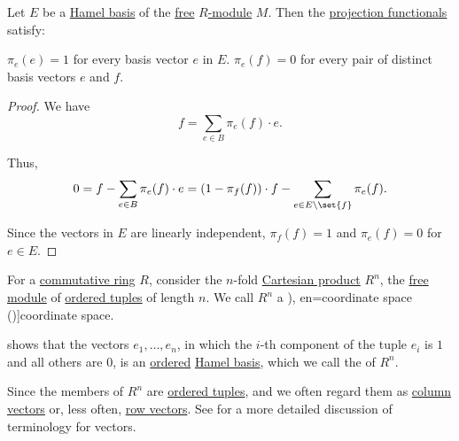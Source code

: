 \begin{proposition}\label{thm:basis_projection_orthonormal}
  Let \( E \) be a \hyperref[def:hamel_basis]{Hamel basis} of the \hyperref[rem:free_module]{free} \hyperref[def:module]{\( R \)-module} \( M \). Then the \hyperref[def:basis_decomposition]{projection functionals} satisfy:
  \begin{thmenum}
     \( \pi_e(e) = 1 \) for every basis vector \( e \) in \( E \).
     \( \pi_e(f) = 0 \) for every pair of distinct basis vectors \( e \) and \( f \).
  \end{thmenum}
\end{proposition}
\begin{proof}
  We have
  \begin{equation*}
    f = \sum_{e \in B} \pi_e(f) \cdot e.
  \end{equation*}

  Thus,
  \begin{equation*}
    0 = f - \sum_{e \in B} \pi_e(f) \cdot e = (1 - \pi_f(f)) \cdot f - \sum_{e \in E \setminus \set{ f }} \pi_e(f).
  \end{equation*}

  Since the vectors in \( E \) are linearly independent, \( \pi_f(f) = 1 \) and \( \pi_e(f) = 0 \) for \( e \in E \).
\end{proof}

\begin{definition}\label{def:coordinate_space}\mimprovised
  For a \hyperref[def:ring/commutative]{commutative ring} \( R \), consider the \( n \)-fold \hyperref[def:cartesian_product]{Cartesian product} \( R^n \), the \hyperref[def:free_semimodule]{free module} of \hyperref[def:ordered_tuple]{ordered tuples} of length \( n \). We call \( R^n \) a \term[ru=координатное пространство (\cite[443]{ИльинСадовничийСендов1985АнализТом1}), en=coordinate space (\cite[4]{Halmos1974VectorSpaces})]{coordinate space}.

   shows that the vectors \( e_1, \ldots, e_n \), in which the \( i \)-th component of the tuple \( e_i \) is \( 1 \) and all others are \( 0 \), is an \hyperref[def:ordered_hamel_basis]{ordered} \hyperref[def:hamel_basis]{Hamel basis}, which we call the  of \( R^n \).
\end{definition}
\begin{comments}
  \item Since the members of \( R^n \) are \hyperref[def:ordered_tuple]{ordered tuples}, and we often regard them as \hyperref[def:array/column_vector]{column vectors} or, less often, \hyperref[def:array/row_vector]{row vectors}. See  for a more detailed discussion of terminology for vectors.
\end{comments}


